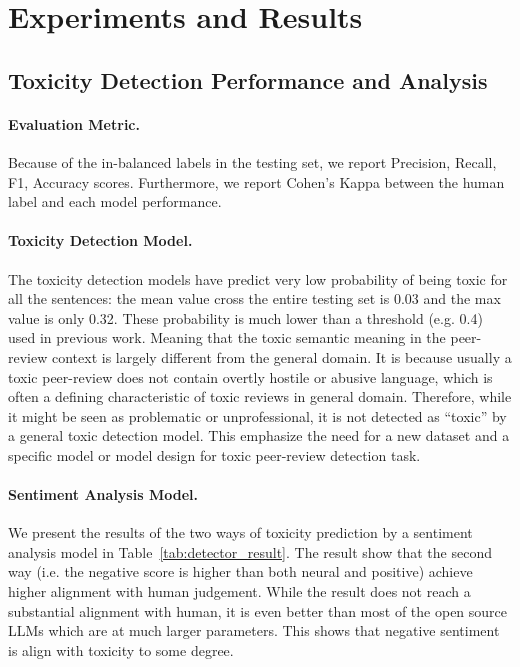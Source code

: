 \section{Experiments and Results}



\subsection{Toxicity Detection Performance and Analysis} 
\label{sec:experiment_performance}

\paragraph{Evaluation Metric.} Because of the in-balanced labels in the testing set, we report Precision, Recall, F1, Accuracy scores. Furthermore, we report Cohen's Kappa between the human label and each model performance.


\paragraph{Toxicity Detection Model.}
The toxicity detection models have predict very low probability of being toxic for all the sentences: the mean value cross the entire testing set is 0.03 and the max value is only 0.32. These probability is much lower than a threshold (e.g. 0.4) used in previous work. Meaning that the toxic semantic meaning in the peer-review context is largely different from the general domain. It is because usually a toxic peer-review does not contain overtly hostile or abusive language, which is often a defining characteristic of toxic reviews in general domain. Therefore, while it might be seen as problematic or unprofessional, it is not detected as ``toxic'' by a general toxic detection model. This emphasize the need for a new dataset and a specific model or model design for toxic peer-review detection task. 

\paragraph{Sentiment Analysis Model.}
We present the results of the two ways of toxicity prediction by a sentiment analysis model in Table~\ref{tab:detector_result}. 
The result show that the second way (i.e. the negative score is higher than both neural and positive) achieve higher alignment with human judgement. While the result does not reach a substantial alignment with human, it is even better than most of the open source LLMs which are at much larger parameters. 
This shows that negative sentiment is align with toxicity to some degree. 

